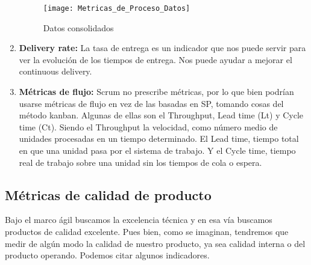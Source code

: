 \begin{enumerate}
  \begin{figure}[h]
  \centering
  \texttt{[image: Metricas\_de\_Proceso\_Datos]}
  \caption{Datos consolidados}
  \centering
  \label{fig:Metricas_de_Proceso_Datos} %
  \end{figure}
  \FloatBarrier

\item {\textbf{Delivery rate:} La tasa de entrega es un indicador que nos puede servir para ver la evolución de los tiempos de entrega. Nos puede ayudar a mejorar el continuous delivery.
}

\item {\textbf{Métricas de flujo:} Scrum no prescribe métricas, por lo que bien podrían usarse métricas de flujo en vez de las basadas en SP, tomando cosas del método kanban. Algunas de ellas son el Throughput, Lead time (Lt) y Cycle time (Ct). Siendo el Throughput la velocidad, como número medio de unidades procesadas en un tiempo determinado. El Lead time, tiempo total en que una unidad pasa por el sistema de trabajo. Y el Cycle time, tiempo real de trabajo sobre una unidad sin los tiempos de cola o espera.
}

\end{enumerate}

\subsection{Métricas de calidad de producto}

Bajo el marco ágil buscamos la excelencia técnica y en esa vía buscamos productos de calidad excelente. Pues bien, como se imaginan, tendremos que medir de algún modo la calidad de nuestro producto, ya sea calidad interna o del producto operando. Podemos citar algunos indicadores.

